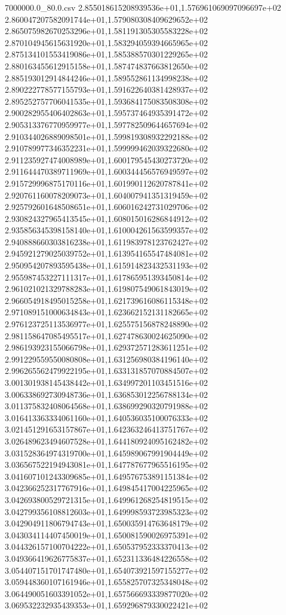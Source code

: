\begin{filecontents*}{7000000.0_80.0.csv}
2.855018615208939536e+01,1.576961069097096697e+02
2.860047207582091744e+01,1.579080308409629652e+02
2.865075982670253296e+01,1.581191305305583228e+02
2.870104945615631920e+01,1.583294059394665965e+02
2.875134101553419086e+01,1.585388570301229265e+02
2.880163455612915158e+01,1.587474837663812650e+02
2.885193012914844246e+01,1.589552861134998238e+02
2.890222778577155793e+01,1.591622640381428937e+02
2.895252757706041535e+01,1.593684175083508308e+02
2.900282955406402863e+01,1.595737464935391472e+02
2.905313376770959977e+01,1.597782509644657694e+02
2.910344026889098501e+01,1.599819308932292188e+02
2.910789977346352231e+01,1.599999462039322680e+02
2.911235927474008989e+01,1.600179545430273720e+02
2.911644470389711969e+01,1.600344456576949597e+02
2.915729996875170116e+01,1.601990112620787841e+02
2.920761160078209073e+01,1.604007941351319459e+02
2.925792601648508651e+01,1.606016242731029706e+02
2.930824327965413545e+01,1.608015016286844912e+02
2.935856345398158140e+01,1.610004261563599357e+02
2.940888660303816238e+01,1.611983978123762427e+02
2.945921279025039752e+01,1.613954165547484081e+02
2.950954207893595438e+01,1.615914823432531193e+02
2.955987453227111317e+01,1.617865951393450814e+02
2.961021021329788283e+01,1.619807549061843019e+02
2.966054918495015258e+01,1.621739616086115348e+02
2.971089151000634843e+01,1.623662152131182665e+02
2.976123725113536977e+01,1.625575156878248890e+02
2.981158647085495517e+01,1.627478630024625090e+02
2.986193923155066798e+01,1.629372571283611251e+02
2.991229559550080808e+01,1.631256980384196140e+02
2.996265562479922195e+01,1.633131857070884507e+02
3.001301938145438442e+01,1.634997201103451516e+02
3.006338692730948736e+01,1.636853012256788134e+02
3.011375832408064568e+01,1.638699290320791988e+02
3.016413363334061160e+01,1.640536035100076333e+02
3.021451291653157867e+01,1.642363246413751767e+02
3.026489623494607528e+01,1.644180924095162482e+02
3.031528364974319700e+01,1.645989067991904449e+02
3.036567522194943081e+01,1.647787677965516195e+02
3.041607101243309685e+01,1.649576753891151384e+02
3.042366252317767916e+01,1.649845417004225965e+02
3.042693800529721315e+01,1.649961268254819515e+02
3.042799356108812603e+01,1.649998593723985323e+02
3.042904911806794743e+01,1.650035914763648179e+02
3.043034114407450019e+01,1.650081590026975391e+02
3.044326157100704222e+01,1.650537952333370413e+02
3.049366419626775837e+01,1.652311336484226558e+02
3.054407151701747480e+01,1.654073921597155277e+02
3.059448360107161946e+01,1.655825707325348048e+02
3.064490051603391052e+01,1.657566693339877020e+02
3.069532232935439353e+01,1.659296879330022421e+02

\end{filecontents*}
